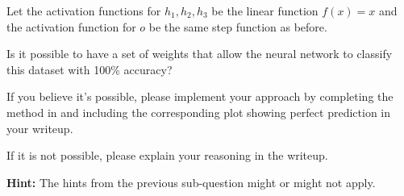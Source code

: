 \item {} Let the activation functions for $h_1, h_2, h_3$ be the linear function $f(x) = x$ and the activation function for $o$ be the same step function as before.

Is it possible to have a set of weights that allow the neural network to classify this dataset with 100\% accuracy?

If you believe it's possible, please implement your approach by completing the  method in  and including the corresponding  plot showing perfect prediction in your writeup.

If it is not possible, please explain your reasoning in the writeup.

\textbf{Hint:} The hints from the previous sub-question might or might not apply.

